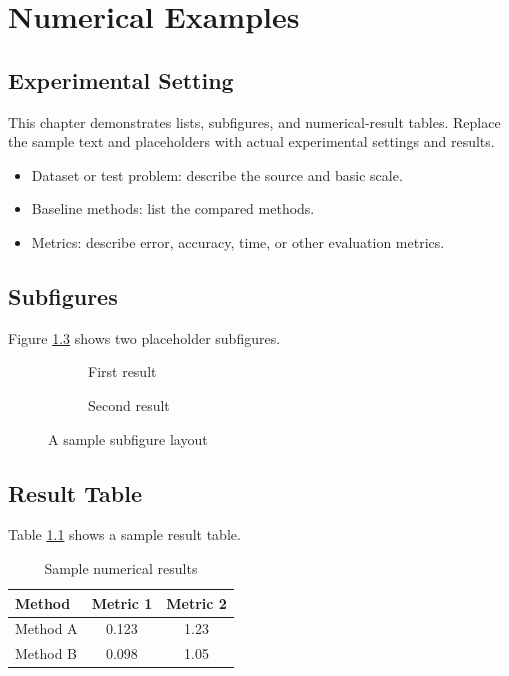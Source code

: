 \chapter{Numerical Examples}

\section{Experimental Setting}

This chapter demonstrates lists, subfigures, and numerical-result tables. Replace the sample text and placeholders with actual experimental settings and results.

\begin{itemize}
  \item Dataset or test problem: describe the source and basic scale.
  \item Baseline methods: list the compared methods.
  \item Metrics: describe error, accuracy, time, or other evaluation metrics.
\end{itemize}

\section{Subfigures}

Figure \ref{fig:subfig-example} shows two placeholder subfigures.
\begin{figure}[htbp]
  \centering
  \begin{subfigure}{0.45\linewidth}
    \centering
    \fbox{\rule{0pt}{30mm}\rule{55mm}{0pt}}
    \caption{First result}
    \label{fig:subfig-a}
  \end{subfigure}
  \hfill
  \begin{subfigure}{0.45\linewidth}
    \centering
    \fbox{\rule{0pt}{30mm}\rule{55mm}{0pt}}
    \caption{Second result}
    \label{fig:subfig-b}
  \end{subfigure}
  \caption{A sample subfigure layout}
  \label{fig:subfig-example}
\end{figure}

\section{Result Table}

Table \ref{tab:results} shows a sample result table.
\begin{table}[htbp]
  \centering
  \caption{Sample numerical results}
  \label{tab:results}
  \begin{tabular}{lcc}
    \toprule
    Method & Metric 1 & Metric 2 \\
    \midrule
    Method A & 0.123 & 1.23 \\
    Method B & 0.098 & 1.05 \\
    \bottomrule
  \end{tabular}
\end{table}
